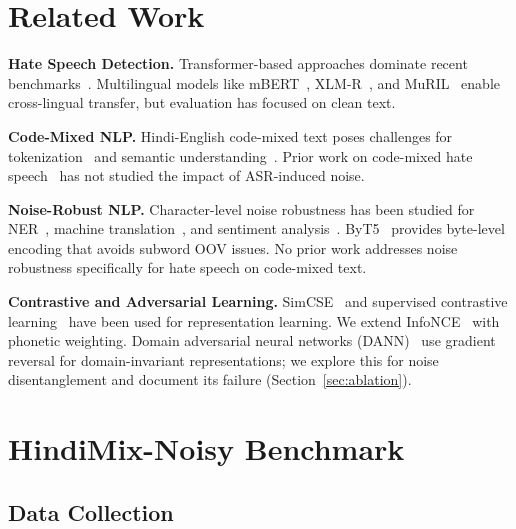 \documentclass[conference]{IEEEtran}
\begin{document}
\section{Related Work}

\textbf{Hate Speech Detection.} Transformer-based approaches dominate recent benchmarks~\cite{mozafari2020bert, caselli2020hatebert}. Multilingual models like mBERT~\cite{devlin2019bert}, XLM-R~\cite{conneau2020xlmr}, and MuRIL~\cite{khanuja2021muril} enable cross-lingual transfer, but evaluation has focused on clean text.

\textbf{Code-Mixed NLP.} Hindi-English code-mixed text poses challenges for tokenization~\cite{pratapa2018language} and semantic understanding~\cite{khanuja2020gluecos}. Prior work on code-mixed hate speech~\cite{bohra2018dataset, mandl2021hasoc} has not studied the impact of ASR-induced noise.

\textbf{Noise-Robust NLP.} Character-level noise robustness has been studied for NER~\cite{piktus2019misspelling}, machine translation~\cite{belinkov2018synthetic}, and sentiment analysis~\cite{eger2019text}. ByT5~\cite{xue2022byt5} provides byte-level encoding that avoids subword OOV issues. No prior work addresses noise robustness specifically for hate speech on code-mixed text.

\textbf{Contrastive and Adversarial Learning.} SimCSE~\cite{gao2021simcse} and supervised contrastive learning~\cite{khosla2020supervised} have been used for representation learning. We extend InfoNCE~\cite{oord2018representation} with phonetic weighting. Domain adversarial neural networks (DANN)~\cite{ganin2016domain} use gradient reversal for domain-invariant representations; we explore this for noise disentanglement and document its failure (Section~\ref{sec:ablation}).

\section{HindiMix-Noisy Benchmark}
\label{sec:benchmark}

\subsection{Data Collection}
\end{document}

